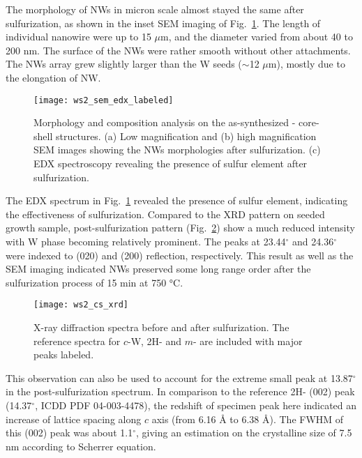The morphology of  NWs in micron scale almost stayed the same after sulfurization, as shown in the inset SEM imaging of Fig.~\ref{fig:ch5ws2sem}. The length of individual nanowire were up to 15 $\mu$m, and the diameter varied from about 40 to 200 nm. The surface of the NWs were rather smooth without other attachments. The NWs array grew slightly larger than the W seeds ($\sim$12 $\mu$m), mostly due to the elongation of NW.
\begin{figure}[htb]
\centering
\texttt{[image: ws2\_sem\_edx\_labeled]}
\caption[Morphology and composition analysis on the as-synthesized - core-shell structures]{Morphology and composition analysis on the as-synthesized - core-shell structures. (a) Low magnification and (b) high magnification SEM images showing the NWs morphologies after sulfurization. (c) EDX spectroscopy revealing the presence of sulfur element after sulfurization.}
\label{fig:ch5ws2sem}
\end{figure}
The EDX spectrum in Fig.~\ref{fig:ch5ws2sem} revealed the presence of sulfur element, indicating the effectiveness of sulfurization. Compared to the XRD pattern on seeded growth  sample, post-sulfurization pattern (Fig.~\ref{fig:ch5ws2xrd}) show a much reduced  intensity with W phase becoming relatively prominent. The peaks at 23.44$^{\circ}$ and 24.36$^{\circ}$ were indexed to  (020) and (200) reflection, respectively. This result as well as the SEM imaging indicated  NWs preserved some long range order after the sulfurization process of 15 min at 750 \si{\degreeCelsius}. 
\begin{figure}[htb]
\centering
\texttt{[image: ws2\_cs\_xrd]}
\caption[X-ray diffraction spectra before and after sulfurization]{X-ray diffraction spectra before and after sulfurization. The reference spectra for $c$-W, 2H- and $m$- are included with major peaks labeled.}
\label{fig:ch5ws2xrd}
\end{figure}
This observation can also be used to account for the extreme small peak at 13.87$^{\circ}$ in the post-sulfurization spectrum. In comparison to the reference 2H- (002) peak (14.37$^{\circ}$, ICDD PDF 04-003-4478), the redshift of specimen peak here indicated an increase of lattice spacing along $c$ axis (from 6.16 \si{\angstrom} to 6.38 \si{\angstrom}). The FWHM of this (002) peak was about 1.1$^{\circ}$, giving an estimation on the crystalline size of 7.5 nm according to Scherrer equation. 

